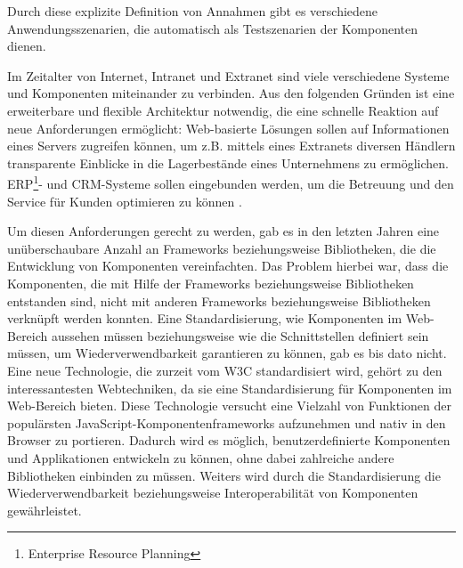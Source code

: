 Durch diese explizite Definition von Annahmen gibt es verschiedene Anwendungsszenarien, die automatisch als Testszenarien der Komponenten dienen.

Im Zeitalter von Internet, Intranet und Extranet sind viele verschiedene Systeme und Komponenten miteinander zu verbinden. Aus den folgenden Gründen ist eine erweiterbare und flexible Architektur notwendig, die eine schnelle Reaktion auf neue Anforderungen ermöglicht: Web-basierte Lösungen sollen auf Informationen eines Servers zugreifen können, um z.B. mittels eines Extranets diversen Händlern transparente Einblicke in die Lagerbestände eines Unternehmens zu ermöglichen. ERP\footnote{Enterprise Resource Planning}- und CRM-Systeme sollen eingebunden werden, um die Betreuung und den Service für Kunden optimieren zu können \citereset \autocite[siehe][S. 39-42]{Andresen.2003}.

Um diesen Anforderungen gerecht zu werden, gab es in den letzten Jahren eine unüberschaubare Anzahl an Frameworks beziehungsweise Bibliotheken, die die Entwicklung von Komponenten vereinfachten. Das Problem hierbei war, dass die Komponenten, die mit Hilfe der Frameworks beziehungsweise Bibliotheken entstanden sind, nicht mit anderen Frameworks beziehungsweise Bibliotheken verknüpft werden konnten. Eine Standardisierung, wie Komponenten im Web-Bereich aussehen müssen beziehungsweise wie die Schnittstellen definiert sein müssen, um Wiederverwendbarkeit garantieren zu können, gab es bis dato nicht. Eine neue Technologie, die zurzeit vom W3C standardisiert wird, gehört zu den interessantesten Webtechniken, da sie eine Standardisierung für Komponenten im Web-Bereich bieten. Diese Technologie versucht eine Vielzahl von Funktionen der populärsten JavaScript-Komponentenframeworks aufzunehmen und nativ in den Browser zu portieren. Dadurch wird es möglich, benutzerdefinierte Komponenten und Applikationen entwickeln zu können, ohne dabei zahlreiche andere Bibliotheken einbinden zu müssen. Weiters wird durch die Standardisierung die Wiederverwendbarkeit beziehungsweise Interoperabilität von Komponenten gewährleistet.


